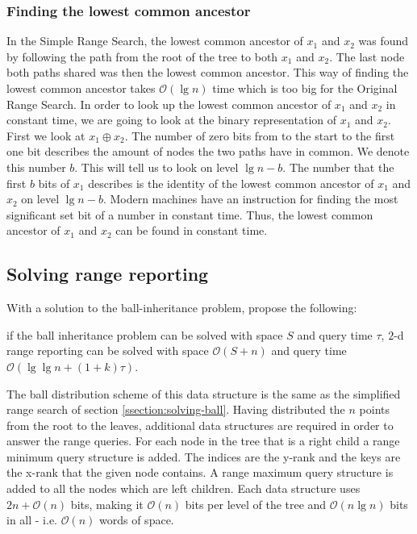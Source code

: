 \subsubsection{Finding the lowest common ancestor}
In the Simple Range Search, the lowest common ancestor of $x_1$ and $x_2$ was found by following the path from the root of the tree to both $x_1$ and $x_2$. The last node both paths shared was then the lowest common ancestor. This way of finding the lowest common ancestor takes $\mathcal{O}(\lg n)$ time which is too big for the Original Range Search.
In order to look up the lowest common ancestor of $x_1$ and $x_2$ in constant time, we are going to look at the binary representation of $x_1$ and $x_2$. First we look at $x_1 \oplus x_2$. The number of zero bits from to the start to the first one bit describes the amount of nodes the two paths have in common. We denote this number $b$. This will tell us to look on level $\lg n - b$. The number that the first $b$ bits of $x_1$ describes is the identity of the lowest common ancestor of $x_1$ and $x_2$ on level $\lg n - b$. Modern machines have an instruction for finding the most significant set bit of a number in constant time. Thus, the lowest common ancestor of $x_1$ and $x_2$ can be found in constant time.


\subsection{Solving range reporting}

With a solution to the ball-inheritance problem, \citet{chanetal} propose the following: 
\begin{customlem}{2.4}\label{lemma24}
if the ball inheritance problem can be solved with space $S$ and query time $\tau$, $2$-d range reporting can be solved with space $\mathcal{O}(S+n)$ and query time $\mathcal{O}(\lg \lg n + (1+k) \tau)$.
\end{customlem}


The ball distribution scheme of this data structure is the same as the simplified range search of section \ref{ssection:solving-ball}. Having distributed the $n$ points from the root to the leaves, additional data structures are required in order to answer the range queries. For each node in the tree that is a right child a range minimum query structure is added. The indices are the y-rank and the keys are the x-rank that the given node contains. A range maximum query structure is added to all the nodes which are left children. Each data structure uses $2n + \mathcal{O}(n)$ bits, making it $\mathcal{O}(n)$ bits per level of the tree and $\mathcal{O}(n \lg n)$ bits in all - i.e. $\mathcal{O}(n)$ words of space. \\

